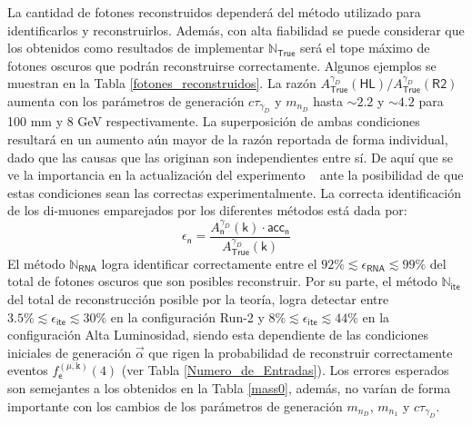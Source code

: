 La cantidad de fotones reconstruidos dependerá del método utilizado para identificarlos y reconstruirlos. Además, con alta fiabilidad se puede considerar que los obtenidos como resultados de implementar $\mathbb{N}_\textsf{True}$ será el tope máximo de fotones oscuros que podrán reconstruirse correctamente. Algunos ejemplos se muestran en la Tabla \ref{fotones_reconstruidos}.
La razón $A_\textsf{True}^{\gamma_D} (\textsf{HL})/A_\textsf{True}^{\gamma_D} (\textsf{R2})$ %
aumenta con los parámetros de generación $c\tau_{\gamma_D}$ y $m_{n_D}$ hasta $\sim 2.2$ y $\sim 4.2$ para 100 mm y 8 GeV respectivamente. La superposición de ambas condiciones resultará en un aumento aún mayor de la razón reportada de forma individual, dado que las causas que las originan son independientes entre sí. De aquí que se ve la importancia en la actualización del experimento \CMS~ ante la posibilidad de que estas condiciones sean las correctas experimentalmente. La correcta identificación de los di-muones emparejados por los diferentes métodos está dada por:
\begin{equation}\label{en}
\epsilon_\textsf{n} = \dfrac{A_\textsf{n}^{\gamma_D} (\textsf{k})\cdot \textsf{acc}_\textsf{n}}{A_\textsf{True}^{\gamma_D} (\textsf{k}) } 
\end{equation}
El método $\mathbb{N}_\textsf{RNA}$ logra identificar correctamente entre el $92\% \lesssim \epsilon_{\textsf{RNA}} \lesssim 99\%$ del total de fotones oscuros que son posibles reconstruir. Por su parte, el método $\mathbb{N}_\textsf{ite}$ %
del total de reconstrucción posible por la teoría, logra detectar entre 
$3.5 \% \lesssim \epsilon_{\textsf{ite}}\lesssim 30\%$ en la configuración Run-2 y $8 \% \lesssim \epsilon_{\textsf{ite}}\lesssim 44\%$ en la configuración Alta Luminosidad, siendo esta dependiente de las condiciones iniciales de generación $\vec{\alpha}$ que rigen la probabilidad de reconstruir correctamente eventos $f^{(\mu, \texttt{k})}_\textsf{e} (4)$ (ver Tabla \ref{Numero_de_Entradas}). Los errores esperados son semejantes a los obtenidos en la Tabla \ref{mass0}, además, no varían de forma importante con los cambios de los parámetros de generación $m_{n_D}$, $m_{n_1}$ y $c\tau_{\gamma_D}$.


